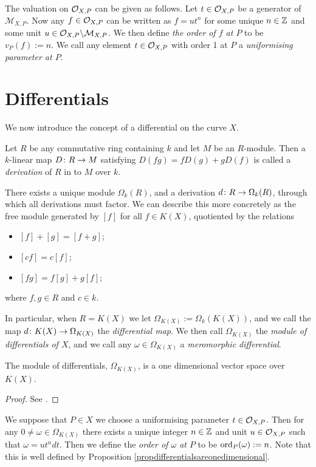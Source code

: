 The valuation on ${\cal O}_{X,P}$ can be given as follows.
Let $t \in {\cal O}_{X,P}$ be a generator of $\mathcal{M}_{X,P}$.
Now any $f \in {\cal O}_{X,P}$ can be written as $f = ut^n$ for some unique $n \in {\mathbb Z}$ and some unit $u \in {\cal O}_{X,P}\backslash \mathcal{M}_{X,P}$.
We then define \emph{the order of $f$ at $P$} to be $v_P(f) := n$.
We call any element $t \in {\cal O}_{X,P}$ with order 1 at $P$ a \emph{uniformising parameter at $P$}.

\section{Differentials}

We now introduce the concept of a differential on the curve $X$.

Let $R$ be any commutative ring containing $k$ and let $M$ be an $R$-module.
Then a $k$-linear map $D \colon R \rightarrow M$ satisfying $D(fg) = fD(g) + gD(f)$ is called a \emph{derivation} of $R$ in to $M$ over $k$.

There exists a unique module $\Omega_k(R)$, and a derivation $d \colon R \rightarrow \Omega_k(R)$, through which all derivations must factor.
We can describe this more concretely as the free module generated by $[f]$ for all $f \in K(X)$, quotiented by the relations
    \begin{itemize}
    \item $[f]+[g] = [f+g]$;
    \item $[cf] = c[f]$;
    \item $[fg] = f[g] + g[f]$;
    \end{itemize}
where $f, g \in R$ and $c \in k$.

In particular, when $R = K(X)$ we let $\Omega_{K(X)} := \Omega_k(K(X))$, and we call the map $d \colon K(X) \rightarrow \Omega_{K(X)}$ the \emph{differential map}.
We then call $\Omega_{K(X)}$ the \emph{module of differentials of $X$}, and we call any $ \omega \in \Omega_{K(X)}$ a \emph{meromorphic differential}.

    \begin{prop}\label{propdifferentialsareonedimensional}
    The module of differentials, $\Omega_{K(X)}$, is a one dimensional vector space over $K(X)$.
    \end{prop}
    \begin{proof}
    See \cite[Prop. 1.5.9]{stichtenoth}.
    \end{proof}

We suppose that $P \in X$ we choose a uniformising parameter $t \in {\cal O}_{X,P}$.
Then for any $ 0 \neq \omega \in \Omega_{K(X)}$ there exists a unique integer $n \in {\mathbb Z}$ and unit $u \in {\cal O}_{X,P}$ such that $\omega = ut^ndt$.
Then we define the \emph{order of $\omega$ at $P$} to be $\operatorname{ord}_P(\omega) := n$.
Note that this is well defined by Proposition \ref{propdifferentialsareonedimensional}.

